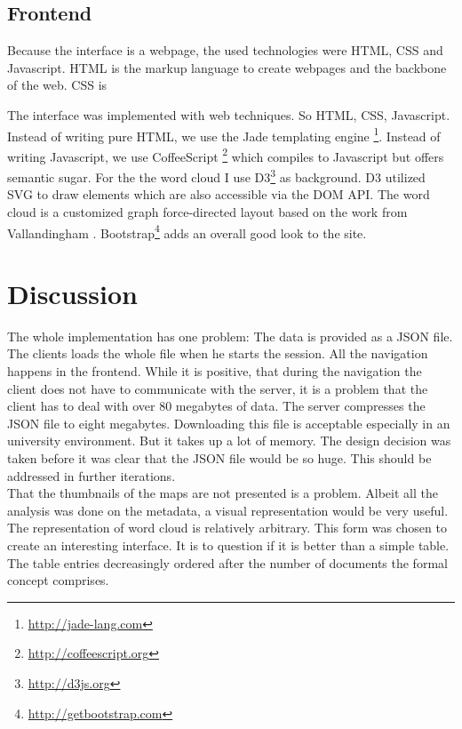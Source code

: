 \documentclass[11pt]{report}
\begin{document}
\subsection{Frontend}

Because the interface is a webpage, the used technologies were HTML, CSS and Javascript. HTML is the markup language to create webpages and the backbone of the web. CSS is


The interface was implemented with web techniques. So HTML, CSS, Javascript. Instead of writing pure HTML, we use the Jade templating engine \footnote{\url{http://jade-lang.com}}. Instead of writing Javascript, we use CoffeeScript \footnote{\url{http://coffeescript.org}} which compiles to Javascript but offers semantic sugar. For the the word cloud I use D3\footnote{\url{http://d3js.org}} \cite{Bostock2011} as background. D3 utilized SVG to draw elements which are also accessible via the DOM API. The word cloud is a customized graph force-directed layout based on the work from Vallandingham \cite{Vallandingham}. Bootstrap\footnote{\url{http://getbootstrap.com}} adds an overall good look to the site.


\section{Discussion}

The whole implementation has one problem: The data is provided as a JSON file. The clients loads the whole file when he starts the session. All the navigation happens in the frontend. While it is positive, that during the navigation the client does not have to communicate with the server, it is a problem that the client has to deal with over 80 megabytes of data. The server compresses the JSON file to eight megabytes. Downloading this file is acceptable especially in an university environment. But it takes up a lot of memory. The design decision was taken before it was clear that the JSON file would be so huge. This should be addressed in further iterations. \\

That the thumbnails of the maps are not presented is a problem. Albeit all the analysis was done on the metadata, a visual representation would be very useful. \\

The representation of word cloud is relatively arbitrary. This form was chosen to create an interesting interface. It is to question if it is better than a simple table. The table entries decreasingly ordered after the number of documents the formal concept comprises. \\
\end{document}
